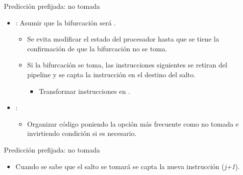 \begin{frame}[t]{Predicción prefijada: no tomada}
\begin{itemize}
  \item {}: Asumir que la bifurcación será .
    \begin{itemize}
      \item Se evita modificar el estado del procesador hasta que 
            se tiene la confirmación de que la bifurcación no se toma.
      \item Si la bifurcación se toma, las instrucciones siguientes se 
            retiran del pipeline y se capta la instrucción en el destino del salto.
        \begin{itemize}
          \item Transformar instrucciones en .
        \end{itemize}
    \end{itemize}

  \item {}:
    \begin{itemize}
      \item Organizar código poniendo la opción más frecuente como no tomada e invirtiendo condición si es necesario.
    \end{itemize}
\end{itemize}
\end{frame}

\begin{frame}[t]{Predicción prefijada: no tomada}
\makebox[\textwidth][c]{

}
\begin{itemize}
  \item Cuando se sabe que el salto se tomará se capta la nueva instrucción (\emph{j+1}).
\end{itemize}
\end{frame}

